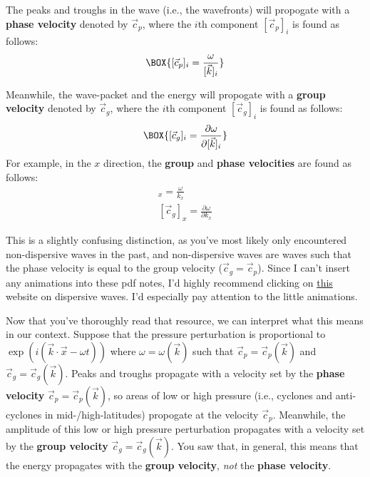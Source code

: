 The peaks and troughs in the wave (i.e., the wavefronts) will propogate with a \textbf{phase velocity} denoted by \(\vec{c}_p\), where the \(i\)th component \([\vec{c}_p]_i\) is found as follows:
\begin{align}
    \label{Phase Velocity}
    \BOX{[\vec{c}_p]_i=\frac{\omega}{[\vec{k}]_i}}
\end{align}

Meanwhile, the wave-packet and the energy will propogate with a \textbf{group velocity} denoted by \(\vec{c}_g\), where the \(i\)th component \([\vec{c}_g]_i\) is found as follows:
\begin{align}
    \label{Group Velocity}
    \BOX{[\vec{c}_g]_i=\frac{\partial\omega}{\partial [\vec{k}]_i}}
\end{align}
For example, in the \(x\) direction, the \textbf{group} and \textbf{phase velocities} are found as follows:
\begin{align*}
    [\vec{c}_p]_x=\frac{\omega}{k_x}\\
    [\vec{c}_g]_x=\frac{\partial\omega}{\partial k_x}
\end{align*}

This is a slightly confusing distinction, as you've most likely only encountered non-dispersive waves in the past, and non-dispersive waves are waves such that the phase velocity is equal to the group velocity (\(\vec{c}_g=\vec{c}_p\)). Since I can't insert any animations into these pdf notes, I'd highly recommend clicking on \href{https://resource.isvr.soton.ac.uk/spcg/tutorial/tutorial/Tutorial_files/Web-further-dispersive.htm}{this} website on dispersive waves. I'd especially pay attention to the little animations.

Now that you've thoroughly read that resource, we can interpret what this means in our context. Suppose that the pressure perturbation is proportional to \(\exp(i(\vec{k}\cdot\vec{x}-\omega t))\) where \(\omega=\omega(\vec{k})\) such that \(\vec{c}_p=\vec{c}_p(\vec{k})\) and \(\vec{c}_g=\vec{c}_g(\vec{k})\). Peaks and troughs propagate with a velocity set by the \textbf{phase velocity} \(\vec{c}_p=\vec{c}_p(\vec{k})\), so areas of low or high pressure (i.e., cyclones and anti-cyclones in mid-/high-latitudes) propogate at the velocity \(\vec{c}_p\). Meanwhile, the amplitude of this low or high pressure perturbation propagates with a velocity set by the \textbf{group velocity} \(\vec{c}_g=\vec{c}_g(\vec{k})\). You saw that, in general, this means that the energy propagates with the \textbf{group velocity}, \textit{not} the \textbf{phase velocity}.

